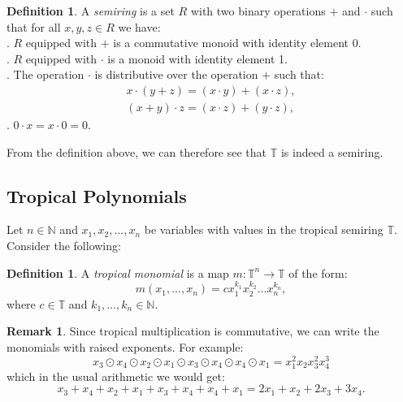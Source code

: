 \documentclass[]{article}
\theoremstyle{definition}
\numberwithin{equation}{section}
\newtheorem{defn}[thm]{Definition}
\newtheorem{rmk}[thm]{Remark}
\renewcommand{\.}{\,.}
\begin{document}
\begin{defn} A \emph{semiring} is a set $R$ with two binary operations $+$ and $\cdot$ such that for all $x,y,z \in R$ we have:
	\\ \setlength{\parindent}{5ex} . $R$ equipped with $+$ is a commutative monoid with identity element 0.   \\
	. $R$ equipped with $\cdot$ is a monoid with identity element 1.    \\
	. The operation $\cdot$ is distributive over the operation $+$ such that:
				\begin{align} x \cdot (y + z)= (x \cdot y)  + (x \cdot z), \nonumber \\
					(x + y) \cdot z= (x \cdot z)  + (y \cdot z), \nonumber 
				\end{align}
 . $0 \cdot x = x \cdot 0 = 0$.  
\end{defn}
 \hspace*{3mm} From the definition above, we can therefore see that $\mathbb{T}$ is indeed a semiring.





\subsection{Tropical Polynomials}
\hspace*{3mm} Let $n \in \mathbb{N}$ and $x_1,x_2,...,x_n$ be variables with values in the tropical semiring $\mathbb{T}$. Consider the following:

		\begin{defn} A \emph{tropical monomial} is a map $m:\mathbb{T}^n\to\mathbb{T}$ of the form: 
			\begin{equation} m(x_1,...,x_n)=cx_1^{k_1}x_2^{k_2}\ldots x_n^{k_n},
				\end{equation}
		where $c\in \mathbb{T}$ and $k_1,\ldots,k_n \in \mathbb{N}$.			\end{defn}
	\begin{rmk}
		Since tropical multiplication is commutative, we can write the monomials with raised exponents. For example:
		\begin{equation}
			x_3\odot x_4 \odot x_2\odot x_1 \odot x_3\odot x_4\odot x_4\odot x_1 =x_1^{2}x_2  x_3^{2}x_4^{3} 
		\end{equation}
		which in the usual arithmetic we would get:
		\begin{equation}
		x_3+ x_4 + x_2+ x_1 + x_3+ x_4+ x_4+ x_1 =2x_1+x_2  +2x_3+3x_4. 
	\end{equation}
	\end{rmk}
	
\end{document}
